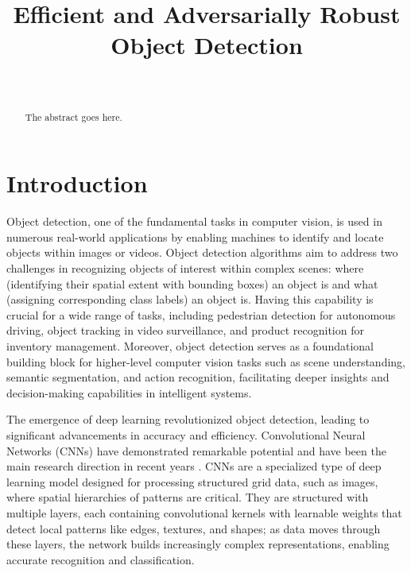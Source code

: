 \documentclass[journal,onecolumn,12pt]{IEEEtran}
\begin{document}
\title{Efficient and Adversarially Robust Object Detection}
\author{
 \\
}

\maketitle

\begin{abstract}
The abstract goes here.
\end{abstract}


\section{Introduction}

Object detection, one of the fundamental tasks in computer vision, is used in numerous real-world applications by enabling machines to identify and locate objects within images or videos. Object detection algorithms aim to address two challenges in recognizing objects of interest within complex scenes: where (identifying their spatial extent with bounding boxes) an object is and what (assigning corresponding class labels) an object is. Having this capability is crucial for a wide range of tasks, including pedestrian detection for autonomous driving, object tracking in video surveillance, and product recognition for inventory management. Moreover, object detection serves as a foundational building block for higher-level computer vision tasks such as scene understanding, semantic segmentation, and action recognition, facilitating deeper insights and decision-making capabilities in intelligent systems.

The emergence of deep learning revolutionized object detection, leading to significant advancements in accuracy and efficiency. Convolutional Neural Networks (CNNs) have demonstrated remarkable potential and have been the main research direction in recent years \cite{zou2023object}. CNNs are a specialized type of deep learning model designed for processing structured grid data, such as images, where spatial hierarchies of patterns are critical. They are structured with multiple layers, each containing convolutional kernels with learnable weights that detect local patterns like edges, textures, and shapes; as data moves through these layers, the network builds increasingly complex representations, enabling accurate recognition and classification.
\end{document}
